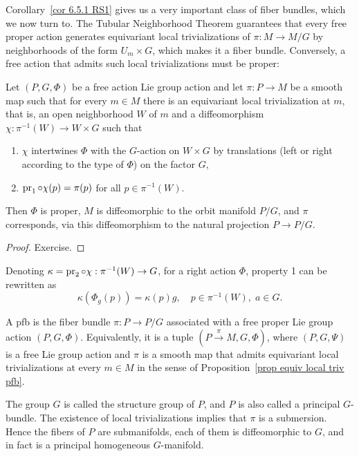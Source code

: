 Corollary~\ref{cor 6.5.1 RS1} gives us a very important class of fiber bundles, which we now turn to. The Tubular Neighborhood Theorem guarantees that every free proper action generates equivariant local trivializations of $\pi:M\to M\slash G$ by neighborhoods of the form $U_m\times G$, which makes it a fiber bundle. Conversely, a free action that admits such local trivializations must be proper:

\begin{prop}\label{prop equiv local triv pfb}
    Let $(P,G,\Phi)$  be a free action Lie group action and let $\pi:P\to M$ be a smooth map such that for every $m\in M$ there is an equivariant local trivialization at $m$, that is, an open neighborhood $W$ of $m$ and a diffeomorphism $\chi:\pi^{-1}(W)\to W\times G$ such that
    \begin{enumerate}
        \item $\chi$ intertwines $\Phi$ with the $G$-action on $W\times G$ by translations (left or right according to the type of $\Phi$) on the factor $G$,
        \item $\operatorname{pr}_1\circ \chi(p)=\pi(p)$ for all $p\in\pi^{-1}(W)$.
    \end{enumerate}
    Then $\Phi$ is proper, $M$ is diffeomorphic to the orbit manifold $P\slash G$, and $\pi$ corresponds, via this diffeomorphism to the natural projection $P\to P\slash G$.
\end{prop}
\begin{proof}
    Exercise.
\end{proof}

Denoting $\kappa=\operatorname{pr}_2\circ\chi :\pi^{-1}(W)\to G$, for a right action $\Phi$, property 1 can be rewritten as 
\[\kappa\left(\Phi_g(p)\right)=\kappa(p)g,\quad p\in\pi^{-1}(W),\; a\in G.\]


\begin{defn}\label{def pfb}
    A \gls{pfb} is the fiber bundle $\pi:P\to P\slash G$ associated with a free proper Lie group action $(P,G,\Phi)$. Equivalently, it is a tuple $(P\overset{\pi}{\to}M,G,\Phi)$, where $(P,G,\Psi)$ is a free Lie group action and $\pi$ is a smooth map that admits equivariant local trivializations at every $m\in M$ in the sense of Proposition~\ref{prop equiv local triv pfb}.

    The group $G$ is called the structure group of $P$, and $P$ is also called a principal $G$-bundle. The existence of local trivializations implies that $\pi$ is a submersion. Hence the fibers of $P$ are submanifolds, each of them is diffeomorphic to $G$, and in fact is a principal homogeneous $G$-manifold.
\end{defn}


